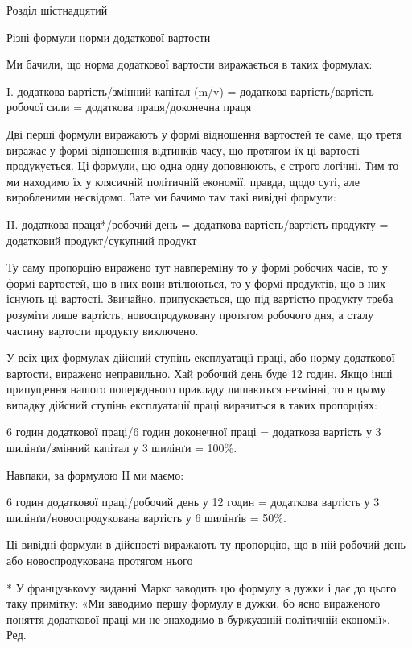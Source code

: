 Розділ шістнадцятий

Різні формули норми додаткової вартости

Ми бачили, що норма додаткової вартости виражається в таких
формулах:

I. додаткова вартість/змінний капітал (m/v) =
додаткова вартість/вартість робочої сили =
додаткова праця/доконечна праця

Дві перші формули виражають у формі відношення вартостей
те саме, що третя виражає у формі відношення відтинків часу,
що протягом їх ці вартості продукується. Ці формули, що одна
одну доповнюють, є строго логічні. Тим то ми находимо їх у клясичній
політичній економії, правда, щодо суті, але виробленими
несвідомо. Зате ми бачимо там такі вивідні формули:

II. додаткова праця*/робочий день =
додаткова вартість/вартість продукту =
додатковий продукт/сукупний продукт

Ту саму пропорцію виражено тут навпереміну то у формі
робочих часів, то у формі вартостей, що в них вони втілюються,
то у формі продуктів, що в них існують ці вартості. Звичайно,
припускається, що під вартістю продукту треба розуміти лише
вартість, новоспродуковану протягом робочого дня, а сталу частину
вартости продукту виключено.

У всіх цих формулах дійсний ступінь експлуатації праці, або
норму додаткової вартости, виражено неправильно. Хай робочий
день буде 12 годин. Якщо інші припущення нашого попереднього
прикладу лишаються незмінні, то в цьому випадку дійсний
ступінь експлуатації праці виразиться в таких пропорціях:

6    годин додаткової праці/6 годин доконечної праці =
додаткова вартість у 3 шилінґи/змінний капітал у 3 шилінґи = 100\%.

Навпаки, за формулою II ми маємо:

6 годин додаткової праці/робочий день у 12 годин =
додаткова вартість у 3 шилінґи/новоспродукована вартість у 6 шилінґів =
50\%.

Ці вивідні формули в дійсності виражають ту пропорцію,
що в ній робочий день або новоспродукована протягом нього

* У французькому виданні Маркс заводить цю формулу в дужки
і дає до цього таку примітку: «Ми заводимо першу формулу в дужки,
бо ясно вираженого поняття додаткової праці ми не знаходимо в буржуазній
політичній економії». Ред.
